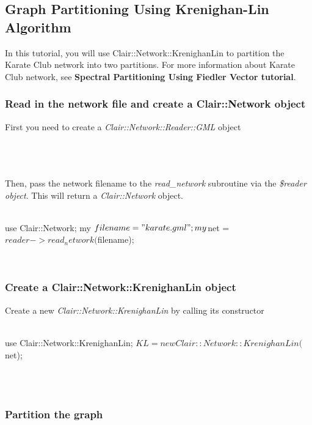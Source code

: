 \subsection{Graph Partitioning Using Krenighan-Lin Algorithm}

In this tutorial, you will use Clair::Network::KrenighanLin to partition the Karate Club network into two partitions. For more information about Karate Club network, see \textbf{Spectral Partitioning Using Fiedler Vector tutorial}.

\subsubsection{Read in the network file and create a Clair::Network object}

First you need to create a \emph{Clair::Network::Reader::GML} object
\\
\\
\\
\\
Then, pass the network filename to the \emph{read\_network} subroutine via the \emph{\$reader object}. This will return a \emph{Clair::Network} object.
\\
\\
\begin{boxedverbatim}
 use Clair::Network;
 my $filename = "karate.gml";
 my $net = $reader->read_network($filename);
\end{boxedverbatim}
\\
\subsubsection{Create a Clair::Network::KrenighanLin object}

Create a new \emph{Clair::Network::KrenighanLin} by calling its constructor
\\
\\
\begin{boxedverbatim}
 use Clair::Network::KrenighanLin;
 $KL = new Clair::Network::KrenighanLin($net);
\end{boxedverbatim}
\\
\\
\subsubsection{Partition the graph}

